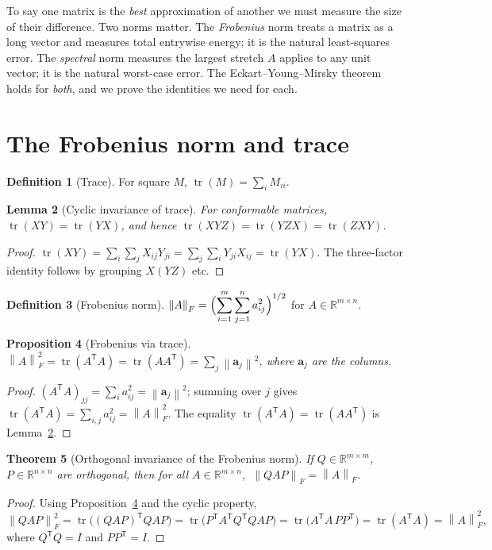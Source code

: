 \documentclass[11pt,oneside]{book}
\theoremstyle{plain}
\newtheorem{theorem}{Theorem}[chapter]
\newtheorem{lemma}[theorem]{Lemma}
\newtheorem{proposition}[theorem]{Proposition}
\theoremstyle{definition}
\newtheorem{definition}[theorem]{Definition}
\theoremstyle{remark}
\newcommand{\R}{\mathbb{R}}
\newcommand{\tr}{\operatorname{tr}}
\newcommand{\norm}[1]{\left\lVert #1 \right\rVert}
\newcommand{\fn}[1]{\norm{#1}_F}
\newcommand{\T}{^{\mathsf T}}
\newcommand{\ba}{\mathbf{a}}
\begin{document}
\begin{intuition_box}
To say one matrix is the \emph{best} approximation of another we must measure the size of
their difference. Two norms matter. The \emph{Frobenius} norm treats a matrix as a long
vector and measures total entrywise energy; it is the natural least-squares error. The
\emph{spectral} norm measures the largest stretch $A$ applies to any unit vector; it is
the natural worst-case error. The Eckart--Young--Mirsky theorem holds for \emph{both},
and we prove the identities we need for each.
\end{intuition_box}

\section{The Frobenius norm and trace}

\begin{definition}[Trace]
For square $M$, $\tr(M)=\sum_i M_{ii}$.
\end{definition}

\begin{lemma}[Cyclic invariance of trace]\label{lem:cyc}
For conformable matrices, $\tr(XY)=\tr(YX)$, and hence $\tr(XYZ)=\tr(YZX)=\tr(ZXY)$.
\end{lemma}
\begin{proof}
$\tr(XY)=\sum_i\sum_j X_{ij}Y_{ji}=\sum_j\sum_i Y_{ji}X_{ij}=\tr(YX)$. The three-factor
identity follows by grouping $X(YZ)$ etc.
\end{proof}

\begin{definition}[Frobenius norm]
$\displaystyle \fn{A}=\Bigl(\sum_{i=1}^m\sum_{j=1}^n a_{ij}^2\Bigr)^{1/2}$ for
$A\in\R^{m\times n}$.
\end{definition}

\begin{proposition}[Frobenius via trace]\label{prop:frobtr}
$\fn{A}^2=\tr(A\T A)=\tr(AA\T)=\sum_j\norm{\ba_j}^2$, where $\ba_j$ are the columns.
\end{proposition}
\begin{proof}
$(A\T A)_{jj}=\sum_i a_{ij}^2=\norm{\ba_j}^2$; summing over $j$ gives
$\tr(A\T A)=\sum_{i,j}a_{ij}^2=\fn{A}^2$. The equality $\tr(A\T A)=\tr(AA\T)$ is
Lemma~\ref{lem:cyc}.
\end{proof}

\begin{theorem}[Orthogonal invariance of the Frobenius norm]\label{thm:frobinv}
If $Q\in\R^{m\times m}$, $P\in\R^{n\times n}$ are orthogonal, then for all
$A\in\R^{m\times n}$, $\ \fn{QAP}=\fn{A}$.
\end{theorem}
\begin{proof}
Using Proposition~\ref{prop:frobtr} and the cyclic property,
\[
\fn{QAP}^2=\tr\bigl((QAP)\T QAP\bigr)=\tr\bigl(P\T A\T Q\T QAP\bigr)
=\tr\bigl(A\T A\,PP\T\bigr)=\tr(A\T A)=\fn{A}^2,
\]
where $Q\T Q=I$ and $PP\T=I$.
\end{proof}
\end{document}
